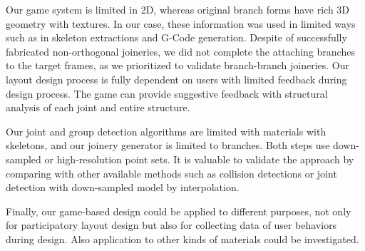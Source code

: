Our game system is limited in 2D, whereas original branch forms have rich 3D geometry with textures.
In our case, these information was used in limited ways such as in skeleton extractions and G-Code generation.
Despite of successfully fabricated non-orthogonal joineries, we did not complete the attaching branches to the target frames, as we prioritized to validate branch-branch joineries.
Our layout design process is fully dependent on users with limited feedback during design process.
The game can provide suggestive feedback with structural analysis of each joint and entire structure.

Our joint and group detection algorithms are limited with materials with skeletons, and our joinery generator is limited to branches.
Both steps use down-sampled or high-resolution point sets.
It is valuable to validate the approach by comparing with other available methods such as collision detections or joint detection with down-sampled model by interpolation.

Finally, our game-based design could be applied to different purposes, not only for participatory layout design but also for collecting data of user behaviors during design.
Also application to other kinds of materials could be investigated.
